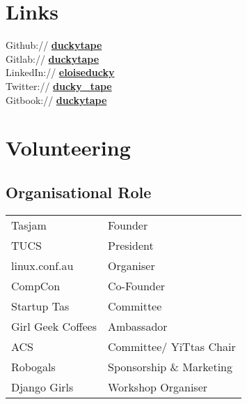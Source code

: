 \documentclass[a4paper]{deedy-resume} %
\begin{document}
\begin{minipage}[t]{0.66\textwidth}


\end{minipage} %


\newpage %

\begin{minipage}[t]{0.33\textwidth} %

\section{Links}

Github:// \href{https://github.com/duckytape}{\bf duckytape} \\
Gitlab:// \href{https://gitlab.com/duckytape} {\bf duckytape} \\
LinkedIn:// \href{https://www.linkedin.com/in/eloiseducky}{\bf eloiseducky} \\
Twitter:// \href{https://twitter.com/ducky_tape}{\bf ducky\_tape}\\
Gitbook:// \href{https:duckytape.gitbooks.io//}{\bf duckytape} \\

\sectionspace %


\section{Volunteering}

\subsection{Organisational Role}
\begin{tabular}{l p{}}
Tasjam & Founder \\
TUCS & President \\
linux.conf.au & Organiser \\
CompCon & Co-Founder \\
Startup Tas & Committee \\
Girl Geek Coffees & Ambassador \\
ACS & Committee/ YiTtas Chair \\
Robogals & Sponsorship \& Marketing \\
Django Girls & Workshop Organiser \\
\end{tabular}


\end{minipage}
\end{document}
